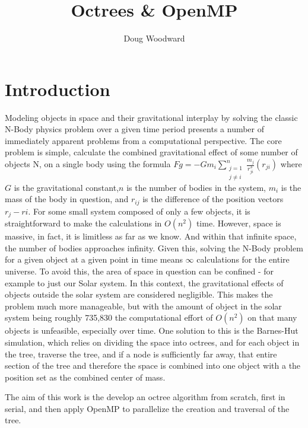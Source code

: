\documentclass[11pt]{article}
\title{\textbf{Octrees \& OpenMP}}
\author{Doug Woodward}
\date{}
\begin{document}
\maketitle

\section{Introduction}

Modeling objects in space and their gravitational interplay by solving the classic N-Body physics problem over a given time period presents a number of immediately apparent problems from a computational perspective. The core problem is simple, calculate the combined gravitational effect of some number of objects N, on a single body using the formula \begin{math}Fg = -Gm_{i}\sum\limits_{\substack{j=1 \\ j\neq i}}^{n}\frac{m_{j}}{r_{ji}^3} (r_{ji})
\end{math} where \(G\) is the gravitational constant,\(n\) is the number of bodies in the system, \(m_{i}\) is the mass of the body in question, and \(r_{ij}\) is the difference of the position vectors \(r_{j}-r{i} \). For some small system composed of only a few objects, it is straightforward to make the calculations in \(O(n^2)\) time. However, space is massive, in fact, it is limitless as far as we know. And within that infinite space, the number of bodies approaches infinity. Given this, solving the N-Body problem for a given object at a given point in time means \(\infty \) calculations for the entire universe. To avoid this, the area of space in question can be confined - for example to just our Solar system. In this context, the gravitational effects of objects outside the solar system are considered negligible. This makes the problem much more manageable, but with the amount of object in the solar system being roughly 735,830 \cite{nasa} the computational effort of \(O(n^2)\) on that many objects is unfeasible, especially over time. One solution to this is the Barnes-Hut simulation, which relies on dividing the space into octrees, and for each object in the tree, traverse the tree, and if a node is sufficiently far away, that entire section of the tree and therefore the space is combined into one object with a the position set as the combined center of mass.

The aim of this work is the develop an octree algorithm from scratch, first in serial, and then apply OpenMP to parallelize the creation and traversal of the tree.
\end{document}
